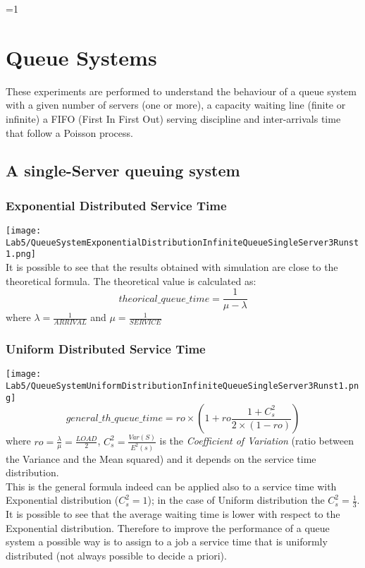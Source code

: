 \documentclass[twocolumn,letterpaper]{report}
\newcounter{debug}
\begin{document}
\twocolumn
\ifnum\value{debug}=1 {
    
\chapter{Queue Systems}
\noindent
	These experiments are performed to understand the behaviour of a queue system with a given number of servers (one or more), a capacity waiting line (finite or infinite) a FIFO (First In First Out) serving discipline and inter-arrivals time that follow a Poisson process.
	
	 \section{A single-Server queuing system}
	 			\subsection{Exponential Distributed Service Time}
	 						\texttt{[image: Lab5/QueueSystemExponentialDistributionInfiniteQueueSingleServer3Runst1.png]} \\
								It is possible to see that the results obtained with simulation are close to the theoretical formula. 
			The theoretical value is calculated as:
			\begin{equation}
				theorical\_queue\_time = \frac{1}{ \mu - \lambda} 
			\end{equation}
				where $\lambda=\frac{1}{ARRIVAL}$ and $\mu=\frac{1}{SERVICE}$
			
	 			\subsection{Uniform Distributed Service Time}
	 			\texttt{[image: Lab5/QueueSystemUniformDistributionInfiniteQueueSingleServer3Runst1.png]} \\
	 			\begin{equation}
						general\_th\_queue\_time = ro \times ( 1 + ro \frac{1+C_s^2}{2\times(1-ro)} )
				\end{equation}
						where $ro=\frac{\lambda}{\mu}=\frac{LOAD}{2}$, $C_s^2=\frac{Var(S)}{E^2(s)}$ is the \emph{Coefficient of Variation} (ratio between the Variance and the Mean squared) and it depends on the service time distribution. \\
						This is the general formula indeed can be applied also to a service time with Exponential distribution ($C_s^2=1$); in the case of Uniform distribution the $C_s^2=\frac{1}{3}$. \\
						It is possible to see that the average waiting time is lower with respect to the Exponential distribution. Therefore to improve the performance of a queue system a possible way is to assign to a job a service time that is uniformly distributed (not always possible to decide a priori).
						
}
\end{document}
